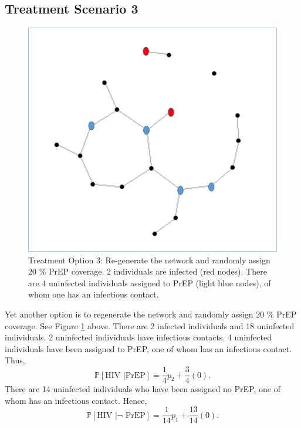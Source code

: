 \documentclass{article}
\theoremstyle{definition}
\begin{document}
\subsection{Treatment Scenario 3}
\begin{figure}[H]
    \centering
    \includegraphics[scale=0.5]{Figures/Network Example 5.png}
    \caption{Treatment Option 3: Re-generate the network and randomly assign 20 \% PrEP coverage. 2 individuals are infected (red nodes). There are 4 uninfected individuals assigned to PrEP (light blue nodes), of whom one has an infectious contact. }
    \label{fig:Figure 6}
\end{figure}

Yet another option is to regenerate the network and randomly assign 20 \% PrEP coverage. See Figure \ref{fig:Figure 6} above. There are 2 infected individuals and 18 uninfected individuals. 2 uninfected individuals have infectious contacts. 4 uninfected individuals have been assigned to PrEP, one of whom has an infectious contact. Thus, $$\mathbb{P}\left[\text{HIV } \vert \text{PrEP}\right]=\frac{1}{4}p_{2}+\frac{3}{4}\left(0\right).$$
There are 14 uninfected individuals who have been assigned no PrEP, one of whom has an infectious contact. Hence, $$\mathbb{P}\left[\text{HIV } \vert \neg \text{ PrEP}\right]=\frac{1}{14}p_{1}+\frac{13}{14}\left(0\right).$$
\end{document}
